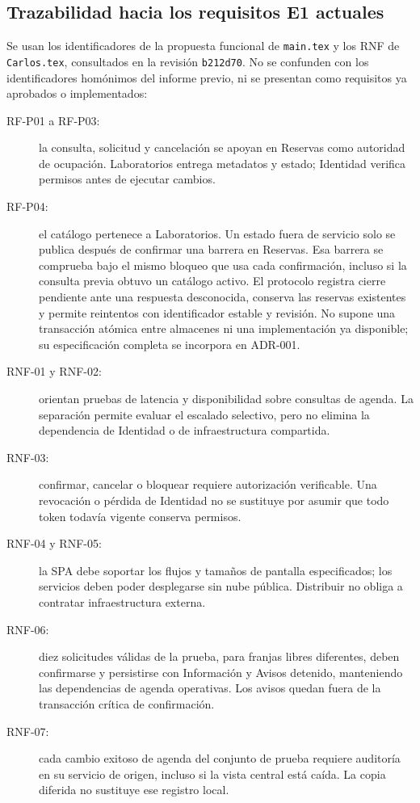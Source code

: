 \subsection{Trazabilidad hacia los requisitos E1 actuales}

Se usan los identificadores de la propuesta funcional de \texttt{main.tex}
y los RNF de \texttt{Carlos.tex}, consultados en la revisión
\texttt{b212d70}. No se confunden con los identificadores homónimos del informe
previo, ni se presentan como requisitos ya aprobados o implementados:
\begin{description}
  \item[RF-P01 a RF-P03:] la consulta, solicitud y cancelación se apoyan en
  Reservas como autoridad de ocupación. Laboratorios entrega metadatos y
  estado; Identidad verifica permisos antes de ejecutar cambios.
  \item[RF-P04:] el catálogo pertenece a Laboratorios. Un estado fuera de
  servicio solo se publica después de confirmar una barrera en Reservas. Esa
  barrera se comprueba bajo el mismo bloqueo que usa cada confirmación, incluso
  si la consulta previa obtuvo un catálogo activo. El protocolo registra
  cierre pendiente ante una respuesta desconocida, conserva las reservas
  existentes y permite reintentos con identificador estable y revisión.
  No supone una transacción atómica entre almacenes ni una implementación ya
  disponible; su especificación completa se incorpora en ADR-001.
  \item[RNF-01 y RNF-02:] orientan pruebas de latencia y disponibilidad sobre
  consultas de agenda. La separación permite evaluar el escalado selectivo,
  pero no elimina la dependencia de Identidad o de infraestructura compartida.
  \item[RNF-03:] confirmar, cancelar o bloquear requiere autorización
  verificable. Una revocación o pérdida de Identidad no se sustituye por
  asumir que todo token todavía vigente conserva permisos.
  \item[RNF-04 y RNF-05:] la SPA debe soportar los flujos y tamaños de pantalla
  especificados; los servicios deben poder desplegarse sin nube pública.
  Distribuir no obliga a contratar infraestructura externa.
  \item[RNF-06:] diez solicitudes válidas de la prueba, para franjas libres
  diferentes, deben confirmarse y persistirse con Información y Avisos
  detenido, manteniendo las dependencias de agenda operativas. Los avisos
  quedan fuera de la transacción crítica de confirmación.
  \item[RNF-07:] cada cambio exitoso de agenda del conjunto de prueba requiere
  auditoría en su servicio de origen, incluso si la vista central está caída.
  La copia diferida no sustituye ese registro local.
\end{description}

